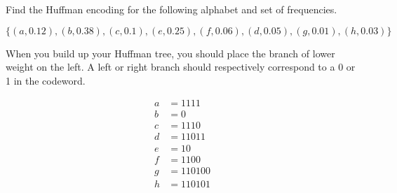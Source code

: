 \begin{blocksection}
\question Find the Huffman encoding for the following alphabet and set of
frequencies.

$\{(a, 0.12), (b, 0.38), (c, 0.1), (e, 0.25), (f, 0.06), (d, 0.05), (g, 0.01), (h, 0.03)\}$

When you build up your Huffman tree, you should place the branch of lower
weight on the left. A left or right branch should respectively correspond to a
0 or 1 in the codeword.

\begin{solution}[2in]
\begin{align*}
a &= 1111 \\
b &= 0 \\
c &= 1110 \\
d &= 11011 \\
e &= 10 \\
f &= 1100 \\
g &= 110100 \\
h &= 110101 \\
\end{align*}
\end{solution}
\end{blocksection}
